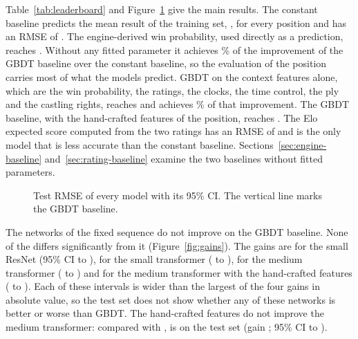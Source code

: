 \documentclass[11pt]{article}
\begin{document}
Table~\ref{tab:leaderboard} and Figure~\ref{fig:scores} give the main
results. The constant baseline predicts the mean result of the training set,
, for every position and has an RMSE of .
The engine-derived win probability, used directly as a prediction, reaches
. Without any fitted parameter it achieves
\% of the improvement of the GBDT baseline
over the constant baseline, so the evaluation of the position carries most of
what the models predict. GBDT on the context features alone, which are the
win probability, the ratings, the clocks, the time control, the ply and the
castling rights, reaches  and achieves
\% of that improvement. The GBDT baseline, with the
hand-crafted features of the position, reaches . The Elo
expected score computed from the two ratings has an RMSE of
 and is the only model that is less accurate than the
constant baseline. Sections~\ref{sec:engine-baseline}
and~\ref{sec:rating-baseline} examine the two baselines without fitted
parameters.

\begin{table}[htbp]\centering\small
{}
\caption{Main results on the  test positions, from
 games, best first. The gain is the paired difference in
RMSE from  on the same resampled games. It is positive when
the model is better, and bold when statistically significant.}
\label{tab:leaderboard}
\end{table}

\begin{figure}[htbp]\centering
{}
\caption{Test RMSE of every model with its 95\% CI. The vertical line marks
the GBDT baseline.}
\label{fig:scores}
\end{figure}

The networks of the fixed sequence do not improve on the GBDT baseline. None
of the  differs significantly from it
(Figure~\ref{fig:gains}). The gains are  for the small
ResNet (95\% CI  to ),
 for the small transformer
( to ),
 for the medium transformer
( to )
and  for the medium transformer with the
hand-crafted features ( to
). Each of these intervals is wider
than the largest of the four gains in absolute value, so the test set does
not show whether any of these networks is better or worse than GBDT.
\ifpairs
The hand-crafted features do not improve the medium transformer: compared
with ,  is
 on the test set
(gain ; 95\% CI
 to
).
\fi
\end{document}
